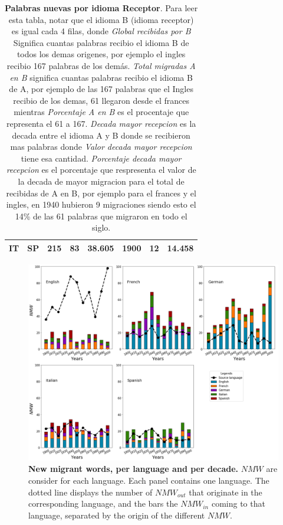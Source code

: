 \documentclass[10pt,letterpaper]{article} %
\begin{document}
\begin{table}
\begin{tabular}{cccccccc}
		IT &       SP &                     215 &                     83 &             38.605 &                    1900 &                            12 &                             14.458 \\
		\bottomrule
	\end{tabular}
	\caption{\textbf{Palabras nuevas por idioma Receptor}. Para leer esta tabla, notar que el idioma B (idioma receptor) es igual cada 4 filas, donde \textit{Global recibidas por B} Significa cuantas palabras recibio el idioma B de todos los demas origenes, por ejemplo el ingles recibio 167 palabras de los demás. \textit{Total migradas A en B} significa cuantas palabras recibio el idioma B de A, por ejemplo de las 167 palabras que el Ingles recibio de los demas, 61 llegaron desde el frances mientras  \textit{Porcentaje A en B} es el procentaje que representa el 61 a 167. \textit{Decada mayor recepcion} es la decada entre el idioma A y B donde se recibieron mas palabras donde \textit{Valor decada mayor recepcion} tiene esa cantidad. \textit{Porcentaje decada mayor recepcion} es el porcentaje que respresenta el valor de la decada de mayor migracion para el total de recibidas de A en B, por ejemplo para el frances y el ingles, en 1940 hubieron 9 migraciones siendo esto el 14\% de las 61 palabras que migraron en todo el siglo.}
	\label{tab.opcional:new_wordsB}
\end{table}

\begin{figure} %
\begin{adjustwidth}{-1.2in}{0in}
\includegraphics[scale=.35]{NW_A_ejes.png}
\caption{{\bf New migrant words, per language and per decade.} 
$NMW$ are consider for each language. Each panel contains one language. 
The dotted line displays the number of $NMW_{out}$ that originate in the 
corresponding language, and the bars the $NMW_{in}$ coming to that language, 
separated by the origin of the different $NMW$. }
% 
\label{fig.NMW_A}
\end{adjustwidth}
\end{figure} %
	
\end{document}
